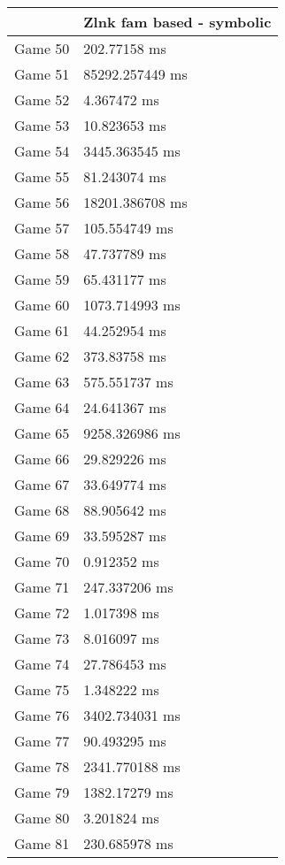 \begin{multicols}{2}
\begin{tabular}{|l|l|}
\end{tabular}\\
\begin{tabular}{|l|l|}
	\hline
	& Zlnk fam based - symbolic \\ \hline
	Game 50 & 202.77158 ms \\ \hline
	Game 51 & 85292.257449 ms \\ \hline
	Game 52 & 4.367472 ms \\ \hline
	Game 53 & 10.823653 ms \\ \hline
	Game 54 & 3445.363545 ms \\ \hline
	Game 55 & 81.243074 ms \\ \hline
	Game 56 & 18201.386708 ms \\ \hline
	Game 57 & 105.554749 ms \\ \hline
	Game 58 & 47.737789 ms \\ \hline
	Game 59 & 65.431177 ms \\ \hline
	Game 60 & 1073.714993 ms \\ \hline
	Game 61 & 44.252954 ms \\ \hline
	Game 62 & 373.83758 ms \\ \hline
	Game 63 & 575.551737 ms \\ \hline
	Game 64 & 24.641367 ms \\ \hline
	Game 65 & 9258.326986 ms \\ \hline
	Game 66 & 29.829226 ms \\ \hline
	Game 67 & 33.649774 ms \\ \hline
	Game 68 & 88.905642 ms \\ \hline
	Game 69 & 33.595287 ms \\ \hline
	Game 70 & 0.912352 ms \\ \hline
	Game 71 & 247.337206 ms \\ \hline
	Game 72 & 1.017398 ms \\ \hline
	Game 73 & 8.016097 ms \\ \hline
	Game 74 & 27.786453 ms \\ \hline
	Game 75 & 1.348222 ms \\ \hline
	Game 76 & 3402.734031 ms \\ \hline
	Game 77 & 90.493295 ms \\ \hline
	Game 78 & 2341.770188 ms \\ \hline
	Game 79 & 1382.17279 ms \\ \hline
	Game 80 & 3.201824 ms \\ \hline
	Game 81 & 230.685978 ms \\ \hline

\end{tabular}
\end{multicols}
